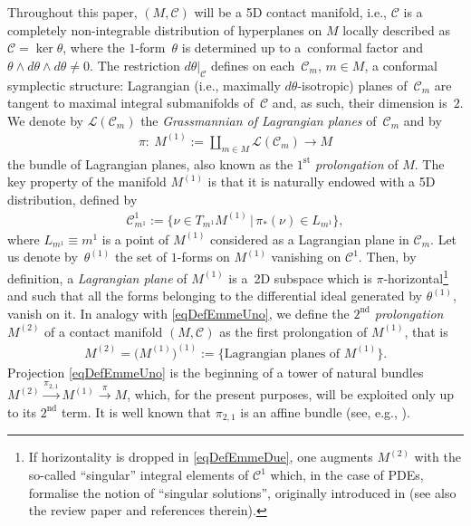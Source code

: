 \documentclass[pdftex]{sigma}
\newcommand{\C}{\mathcal{C}}
\newcommand{\St}{^\textrm{st}}
\newcommand{\Nd}{^\textrm{nd}}
\newcommand{\w}{\nu}
\numberwithin{equation}{section}
\begin{document}
Throughout this paper, $(M,\C)$ will be a 5D contact manifold, i.e., $\C$ is a completely non-integrable distribution of hyperplanes on $M$ locally described as $\C=\ker\theta$, where the $1$-form~$\theta$ is determined up to a~conformal factor and $\theta\wedge d\theta\wedge d\theta\neq 0$. The restriction $d \theta|_{\mathcal{C}}$
def\/ines on each~$\mathcal{C}_m$, $m\in M$, a conformal symplectic structure: Lagrangian (i.e., maximally $d\theta$-isotropic) planes of~$\mathcal{C}_m$ are tangent to maximal integral submanifolds of~$\mathcal{C}$ and, as such, their dimension is~$2$. We denote by $\mathcal{L}(\mathcal{C}_m)$ the \emph{Grassmannian of Lagrangian planes} of~$\mathcal{C}_m$ and by
\begin{gather}\label{eqDefEmmeUno}
\pi\colon \ M^{(1)} := \coprod_{m \in M}\mathcal{L}(\mathcal{C}_m) \to M
\end{gather}
the bundle of Lagrangian planes, also known as the $1\St$ \emph{prolongation} of $M$. The key property of the manifold $M^{(1)}$ is that it is naturally endowed
with a 5D distribution, def\/ined by
\begin{gather*}
\mathcal{C}^{1}_{m^1}:=\big\{\w\in T_{m^1}M^{(1)}\,|\,
\pi_{*}(\w)\in L_{m^1}\big\},\end{gather*}
where $L_{m^1}\equiv m^1$ is a point of $M^{(1)}$ considered as
a Lagrangian plane in $\mathcal{C}_{m}$.
Let us denote by~$\theta^{(1)}$ the set of $1$-forms on $M^{(1)}$ vanishing on $\mathcal{C}^{1}$. Then, by def\/inition, a \emph{Lagrangian plane} of $M^{(1)}$ is a~2D subspace which is $\pi$-horizontal\footnote{If horizontality is dropped in \eqref{eqDefEmmeDue}, one augments $M^{(2)}$ with the so-called ``singular'' integral elements of $\C^1$ which, in the case of PDEs, formalise the notion of ``singular solutions'', originally introduced in \cite{MR966202} (see also the review paper \cite{LucaChar} and references therein).} and such that all the forms belonging to the dif\/ferential ideal generated by $\theta^{(1)}$, vanish on it. In analogy with \eqref{eqDefEmmeUno}, we def\/ine the $2\Nd$ \emph{prolongation} $M^{(2)}$ of a contact
manifold $(M, \mathcal{C})$ as the f\/irst prolongation of $M^{(1)}$, that is
\begin{gather}\label{eqDefEmmeDue}
M^{(2)}=\big(M^{(1)}\big)^{(1)}:=\big\{ \text{Lagrangian planes of $M^{(1)}$} \big\}.
\end{gather}
Projection \eqref{eqDefEmmeUno} is the beginning of a tower of natural bundles $M^{(2)} \overset{\pi_{2,1}}{\longrightarrow} M^{(1)} \overset{\pi}{\longrightarrow} M
$,
which, for the present purposes, will be exploited only up to its $2\Nd$ term.
It is well known that $\pi_{2,1}$ is an af\/f\/ine bundle (see, e.g., \cite{MR1202431}).
\end{document}
